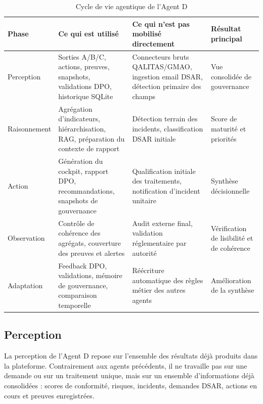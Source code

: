 \documentclass[12pt,a4paper]{report}
\begin{document}
\begin{table}[H]
\centering
\caption{Cycle de vie agentique de l'Agent D}
\label{tab:cycle_agent_d}
\begin{tabularx}{\textwidth}{|p{2.2cm}|X|X|X|}
\hline
\textbf{Phase} & \textbf{Ce qui est utilisé} & \textbf{Ce qui n'est pas mobilisé directement} & \textbf{Résultat principal} \\
\hline
Perception & Sorties A/B/C, actions, preuves, snapshots, validations DPO, historique SQLite & Connecteurs bruts QALITAS/GMAO, ingestion email DSAR, détection primaire des champs & Vue consolidée de gouvernance \\
\hline
Raisonnement & Agrégation d'indicateurs, hiérarchisation, RAG, préparation du contexte de rapport & Détection terrain des incidents, classification DSAR initiale & Score de maturité et priorités \\
\hline
Action & Génération du cockpit, rapport DPO, recommandations, snapshots de gouvernance & Qualification initiale des traitements, notification d'incident unitaire & Synthèse décisionnelle \\
\hline
Observation & Contrôle de cohérence des agrégats, couverture des preuves et alertes & Audit externe final, validation réglementaire par autorité & Vérification de lisibilité et de cohérence \\
\hline
Adaptation & Feedback DPO, validations, mémoire de gouvernance, comparaison temporelle & Réécriture automatique des règles métier des autres agents & Amélioration de la synthèse \\
\hline
\end{tabularx}
\end{table}

\subsection{Perception}

La perception de l'Agent D repose sur l'ensemble des résultats déjà produits dans la plateforme. Contrairement aux agents précédents, il ne travaille pas sur une demande ou sur un traitement unique, mais sur un ensemble d'informations déjà consolidées : scores de conformité, risques, incidents, demandes DSAR, actions en cours et preuves enregistrées.
\end{document}
